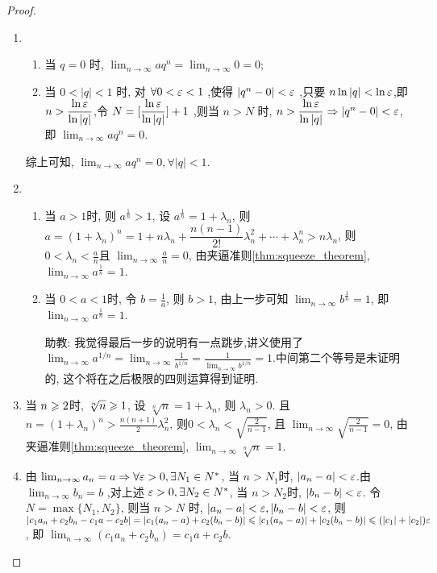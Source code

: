 \begin{proof}
    \begin{enumerate}
        \item 
        \begin{enumerate}
            \item 当 $q=0$ 时, $\lim_{n \to \infty} aq^n= \lim_{n \to \infty} 0 = 0$;
            \item 当 $0 < |q| < 1$ 时, 对 $\forall 0 < \varepsilon < 1 $ ,使得 $|q^n - 0 | < \varepsilon $ ,只要 $n \ln |q| < \ln \varepsilon $,即 $n > \dfrac{\ln \varepsilon}{\ln |q|}$,令 $N = [ \dfrac{\ln \varepsilon}{\ln |q|} ] + 1$ ,则当 $n > N$ 时, $n > \dfrac{\ln \varepsilon}{\ln |q|} \Rightarrow |q^n - 0 | < \varepsilon $,即 $\lim_{n \to \infty} aq^n=0$.
        \end{enumerate}
        综上可知, $\lim_{n \to \infty} aq^n=0, \forall |q|<1$.

        \item 
        \begin{enumerate}
            \item 当 $a>1$时, 则 $a^{\frac1n} > 1$, 设 $ a^{\frac1n} = 1 + \lambda_n$, 则 $a = (1+\lambda_n)^n = 1 + n\lambda_n + \dfrac{n(n-1)}{2!}\lambda_n^2 + \cdots + \lambda_n^n > n\lambda_n$, 则 $ 0 < \lambda_n < \frac{a}{n} $且 $\lim_{n \to \infty} \frac{a}{n} = 0$, 由夹逼准则\ref{thm:squeeze_theorem}, $\lim_{n \to \infty} a^{\frac1n} = 1$.
            \item 当 $0 < a <1 $时, 令 $b = \frac1a$, 则 $b > 1$, 由上一步可知 $\lim_{n \to \infty} b^{\frac1n} = 1$, 即 $\lim_{n \to \infty} a^{\frac1n} = 1$.
            
            \begin{remark}
                助教: 我觉得最后一步的说明有一点跳步,讲义使用了$\lim_{n \to \infty} a^{1/n} = \lim_{n \to \infty} \frac{1}{b^{1/n}} = \frac{1}{\lim_{n \to \infty} b^{1/n}} = 1$.中间第二个等号是未证明的, 这个将在之后极限的四则运算得到证明.
            \end{remark}
        \end{enumerate}

        \item 
        当 $n \geqslant 2$时, $\sqrt[n]{n} \geqslant 1$, 设 $\sqrt[n]{n} = 1 + \lambda_n$, 则 $\lambda_n >0$. 且 $n = (1 + \lambda_n)^n > \frac{n(n+1)}{2} \lambda_n^2 $, 则$ 0 < \lambda_n < \sqrt{\frac{2}{n-1}}$, 且 $\lim_{n \to \infty} \sqrt{\frac{2}{n-1}} = 0$, 由夹逼准则\ref{thm:squeeze_theorem}, $\lim_{n \to \infty} \sqrt[n]{n} = 1$.

        \item 
        由 $\lim_{n \to \infty} a_n = a \Rightarrow \forall \varepsilon > 0 , \exists N_1 \in N^*$, 当 $n > N_1 $时, $ |a_n - a| < \varepsilon $.由 $\lim_{n \to \infty} b_n = b$ ,对上述 $\varepsilon >0 , \exists N_2 \in N^*$, 当 $n > N_2 $时, $ |b_n - b| < \varepsilon $. 令 $N = \max\{N_1,N_2\}$, 则当 $n > N$ 时, $ |a_n - a| < \varepsilon, |b_n - b| < \varepsilon $, 则 $ |c_1a_n + c_2b_n - c_1a - c_2b| = |c_1(a_n - a) + c_2(b_n - b)| \leqslant |c_1(a_n - a)| + |c_2(b_n - b)| \leqslant ( |c_1| + |c_2| ) \varepsilon $, 即 $\lim_{n \to \infty} (c_1a_n + c_2b_n) = c_1a + c_2b$.
        

\end{enumerate}
\end{proof}
